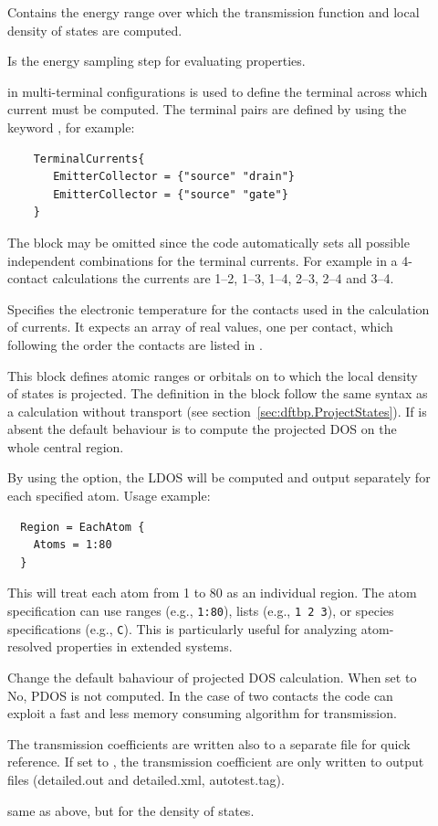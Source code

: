 \begin{description}


\item[] Contains the energy range over
  which the transmission function and local density of states are computed.
\item[] Is the energy sampling step for
  evaluating properties.
\item[] in multi-terminal configurations is used to define
  the terminal across which current must be computed. The terminal pairs are
  defined by using the keyword , for example:
   \begin{verbatim}
    TerminalCurrents{
       EmitterCollector = {"source" "drain"}
       EmitterCollector = {"source" "gate"}
    }
  \end{verbatim}
  The block  may be omitted since the code automatically
  sets all possible independent combinations for the terminal currents. For
  example in a 4-contact calculations the currents are 1--2, 1--3, 1--4, 2--3,
  2--4 and 3--4.
\item[] Specifies the electronic
  temperature for the contacts used in the calculation of currents. It expects
  an array of real values, one per contact, which following the order the
  contacts are listed in .
\item[] \label{Region} This block defines atomic ranges or orbitals
  on to which the local density of states is projected. The definition in the
  block follow the same syntax as a \dftbp{} calculation without transport (see
  section~\ref{sec:dftbp.ProjectStates}). If  is absent the default
  behaviour is to compute the projected DOS on the whole central region.
  
  By using the  option, the LDOS will be computed and 
  output separately for each specified atom. Usage example:
  \begin{verbatim}
  Region = EachAtom {
    Atoms = 1:80
  }
  \end{verbatim}
  This will treat each atom from 1 to 80 as an individual region. The atom
  specification can use ranges (e.g., \verb|1:80|), lists (e.g., \verb|1 2 3|),
  or species specifications (e.g., \verb|C|). This is particularly useful for
  analyzing atom-resolved properties in extended systems.
\item[] Change the default bahaviour of projected DOS calculation.
  When set to No, PDOS is not computed. In the case of two contacts
  the code can exploit a fast and less memory consuming algorithm for transmission.
\item[] The transmission coefficients are written also to a
  separate file for quick reference. If set to , the transmission
  coefficient are only written to \dftbp{} output files (detailed.out and
  detailed.xml, autotest.tag).
\item[] same as above, but for the density of states.

\end{description}

